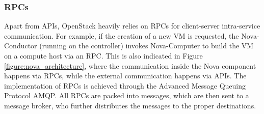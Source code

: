             
            \subsubsection{\acp{RPC}}
                
                Apart from \acp{API}, OpenStack heavily relies on \acp{RPC} for client-server intra-service communication. 
                For example, if the creation of a new \ac{VM} is requested, the Nova-Conductor (running on the controller) invokes Nova-Computer to build the \ac{VM} on a compute host via an \ac{RPC}.
                This is also indicated in Figure \ref{figure:nova_architecture}, where the communication inside the Nova component happens via \acp{RPC}, while the external communication happens via \acp{API}.
                The implementation of \acp{RPC} is achieved through the Advanced Message Queuing Protocol AMQP.
                All \acp{RPC} are packed into messages, which are then sent to a message broker, who further distributes the messages to the proper destinations.
                